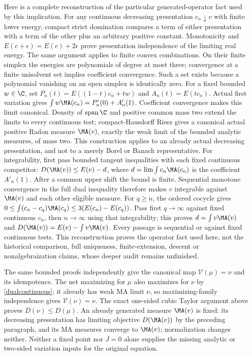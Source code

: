 Here is a complete reconstruction of the particular generated-operator
fact used by this implication. For any continuous decreasing
presentation $c_n\downarrow v$ with finite lower energy, compact strict
domination compares a term of either presentation with a term of the
other plus an arbitrary positive constant. Monotonicity and
$E(c+\epsilon)=E(c)+2\epsilon$ prove presentation independence of
the limiting real energy. The same argument applies to finite convex
combinations. On their finite simplex the energies are polynomials of
degree at most three; convergence at a finite unisolvent set implies
coefficient convergence. Such a set exists because a polynomial
vanishing on an open simplex is identically zero.
For a fixed bounded $w\in\C$, set
$P_n(t)=E((1-t)c_n+tw)$ and $A_n(t)=E(tc_n)$.
Actual first variation gives
$\int w\MA(c_n)=P'_n(0)+A'_n(1)$.
Coefficient convergence makes this limit canonical. Density of
$\operatorname{span}\C$ and positive common mass two extend the limits
to every continuous test; compact-Hausdorff Riesz gives a canonical
actual positive Radon measure $\MA(v)$, exactly the weak limit of the
bounded analytic measures, of mass two. This construction applies to
an already actual decreasing presentation, and not to a merely Borel
or Banach representative.
For integrability, first pass bounded tangent inequalities with each
fixed continuous competitor: $D(\MA(v))\le E(v)-d$, where
$d=\lim\int c_n\MA(c_n)$ is the coefficient $A'_n(1)$.
After a common upper shift the bound is finite. Sequential monotone
convergence in the full dual inequality therefore makes $v$ integrable
against $\MA(v)$ and each other eligible measure.
For $q\ge n$, the ordered cocycle gives
$0\le\int(c_n-c_q)\MA(c_q)\le3(E(c_n)-E(c_q))$.
Pass first $q\to\infty$ against fixed continuous $c_n$, then
$n\to\infty$ using that integrability; this proves
$d=\int v\MA(v)$ and
$D(\MA(v))=E(v)-\int v\MA(v)$.
Every passage is sequential or against fixed continuous tests.
This reconstruction proves the operator fact used here, not the
historical comparison, full uniqueness, finite-extension, descent or
nonalgebraization claims, whose deeper audit remains unfinished.

The same bounded proofs independently give the canonical map
$\mathcal V(\mu)=\nu$ and its idempotence. The net maximizing for
$\mu$ also maximizes for $\nu$ by \eqref{dualcontinuous}; it already
has weak MA limit $\nu$, so maximizing-family independence gives
$\mathcal V(\nu)=\nu$. The exact one-sided cubic Taylor argument
above proves $D(\nu)\le D(\mu)$. An already generated measure
$\MA(v)$ is fixed: its decreasing presentation has limiting
objective $D(\MA(v))$ by the preceding paragraph, and its MA measures
converge to $\MA(v)$; normalization changes neither. Neither a fixed
point nor $J=0$ alone supplies the missing analytic or two-sided
variation inputs for the original equation.

